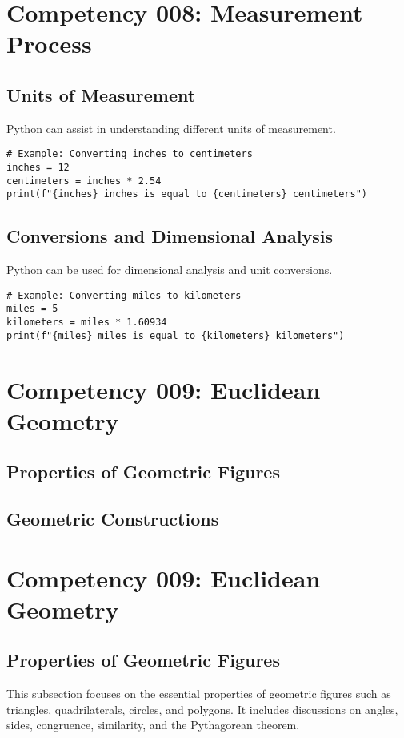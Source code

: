 \documentclass{book}
\begin{document}
\section{Competency 008: Measurement Process}
\subsection{Units of Measurement}
Python can assist in understanding different units of measurement.


\begin{lstlisting}[style=pythonstyle]
# Example: Converting inches to centimeters
inches = 12
centimeters = inches * 2.54
print(f"{inches} inches is equal to {centimeters} centimeters")
\end{lstlisting}


\subsection{Conversions and Dimensional Analysis}
Python can be used for dimensional analysis and unit conversions.


\begin{lstlisting}[style=pythonstyle]
# Example: Converting miles to kilometers
miles = 5
kilometers = miles * 1.60934
print(f"{miles} miles is equal to {kilometers} kilometers")
\end{lstlisting}



\section{Competency 009: Euclidean Geometry}
\subsection{Properties of Geometric Figures}
\subsection{Geometric Constructions}


\section{Competency 009: Euclidean Geometry}


\subsection{Properties of Geometric Figures}
This subsection focuses on the essential properties of geometric figures such as triangles, quadrilaterals, circles, and polygons. It includes discussions on angles, sides, congruence, similarity, and the Pythagorean theorem.
\end{document}

